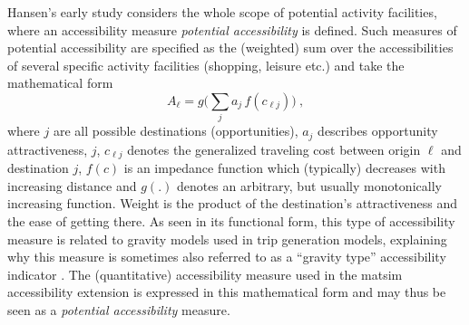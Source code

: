 Hansen's early study \citep{Hansen1959HowAccessibilityShapesLandUse} 
considers the whole scope of potential activity facilities, where an accessibility 
measure \emph{potential accessibility} is defined. Such measures of potential accessibility are 
specified as the (weighted) sum over the 
accessibilities of several specific activity facilities (\eg shopping, leisure etc.) and take the mathematical form
\begin{equation}
	A_\ell = g\Big( \sum_j a_j \, f(c_{\ell j}) \Big) \ ,
	\label{eq:accessibility:basic}
\end{equation}
where $j$ are all possible destinations (opportunities), $a_j$ describes opportunity attractiveness, 
$j$, $c_{\ell j}$ denotes the generalized traveling cost between origin $\ell$ and destination $j$,
$f(c)$ is an impedance function which (typically) decreases with increasing distance and $g(.)$ denotes
an arbitrary, but usually monotonically increasing function. 
Weight is the product of the destination's attractiveness and the ease of getting there. As seen in its 
functional form, this type of accessibility measure is related to gravity models used in trip generation models, explaining 
why this measure is sometimes also referred to as a ``gravity type'' accessibility indicator 
\citep{MorrisEtAl1979AccessibilityIndicators}. The (quantitative) accessibility measure used in the \gls{matsim} 
accessibility extension is expressed in this mathematical form and may thus be seen as a \emph{potential accessibility} measure.


